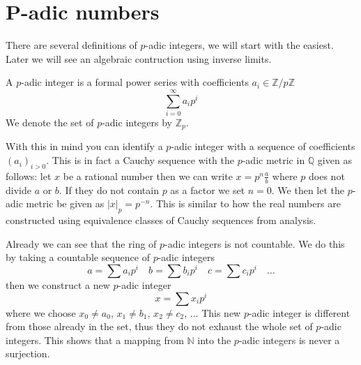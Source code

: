 \section{P-adic numbers} \label{p-adic}
There are several definitions of $p$-adic integers, we will start with the easiest. Later we
will see an algebraic contruction using inverse limits.
\begin{mydef}
 A $p$-adic integer is a formal power series with coefficients $a_i \in \mathbb{Z}/p\mathbb{Z}$
$$ \sum_{i=0}^{\infty} a_i p^i $$
We denote the set of $p$-adic integers by $\mathbb{Z}_p$.
\end{mydef}
With this in mind you can identify a $p$-adic integer with a sequence of coefficients
$(a_i)_{i > 0}$. This is in fact a Cauchy sequence with the $p$-adic metric in $\mathbb{Q}$ given as follows:
let $x$ be a rational number then we can write $x = p^n \frac{a}{b}$ where $p$ does not divide $a$ or $b$.
If they do not contain $p$ as a factor we set $n=0$. We then let the $p$-adic metric be given as
$|x|_p = p^{-n}$. This is similar to how the real numbers are constructed using equivalence classes
of Cauchy sequences from analysis.

Already we can see that the ring of $p$-adic integers is not countable. We do this by taking
a countable sequence of $p$-adic integers
$$a = \sum a_i p^i \quad b = \sum b_i p^i \quad c = \sum c_i p^i \quad \ldots $$
then we construct a new $p$-adic integer
$$x = \sum x_i p^i $$
where we choose $x_0 \neq a_0$, $x_1 \neq b_1$, $x_2 \neq c_2$, $\ldots$
This new $p$-adic integer is different from those already in the set, thus they do not
exhaust the whole set of $p$-adic integers. This shows that a mapping from $\mathbb{N}$ into
the $p$-adic integers is never a surjection.

